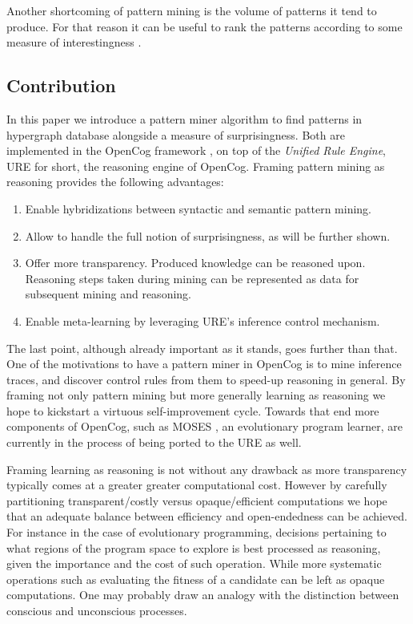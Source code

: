 \documentclass[runningheads]{llncs}
\begin{document}
Another shortcoming of pattern mining is the volume of patterns it
tend to produce. For that reason it can be useful to rank the patterns
according to some measure of interestingness \cite{Vreeken2014}.

\subsection{Contribution}

In this paper we introduce a pattern miner algorithm to find patterns
in hypergraph database alongside a measure of surprisingness. Both are
implemented in the OpenCog framework \cite{Goertzel2014}, on top of the
\emph{Unified Rule Engine}, URE for short, the reasoning engine of
OpenCog. Framing pattern mining as reasoning provides the following
advantages:
\begin{enumerate}
\item Enable hybridizations between syntactic and semantic pattern
  mining.
\item Allow to handle the full notion of surprisingness, as will be
  further shown.
\item Offer more transparency. Produced knowledge can be reasoned
  upon. Reasoning steps taken during mining can be represented as data
  for subsequent mining and reasoning.
\item Enable meta-learning by leveraging URE's inference control
  mechanism.
\end{enumerate}
The last point, although already important as it stands, goes further
than that. One of the motivations to have a pattern miner in OpenCog
is to mine inference traces, and discover control rules from them to
speed-up reasoning in general. By framing not only pattern mining but
more generally learning as reasoning we hope to kickstart a virtuous
self-improvement cycle. Towards that end more components of OpenCog,
such as MOSES \cite{Looks06abstractcompetent}, an evolutionary program
learner, are currently in the process of being ported to the URE as
well.

Framing learning as reasoning is not without any drawback as more
transparency typically comes at a greater greater computational
cost. However by carefully partitioning transparent/costly versus
opaque/efficient computations we hope that an adequate balance between
efficiency and open-endedness can be achieved. For instance in the
case of evolutionary programming, decisions pertaining to what regions
of the program space to explore is best processed as reasoning, given
the importance and the cost of such operation. While more systematic
operations such as evaluating the fitness of a candidate can be left
as opaque computations. One may probably draw an analogy with the
distinction between conscious and unconscious processes.
\end{document}
